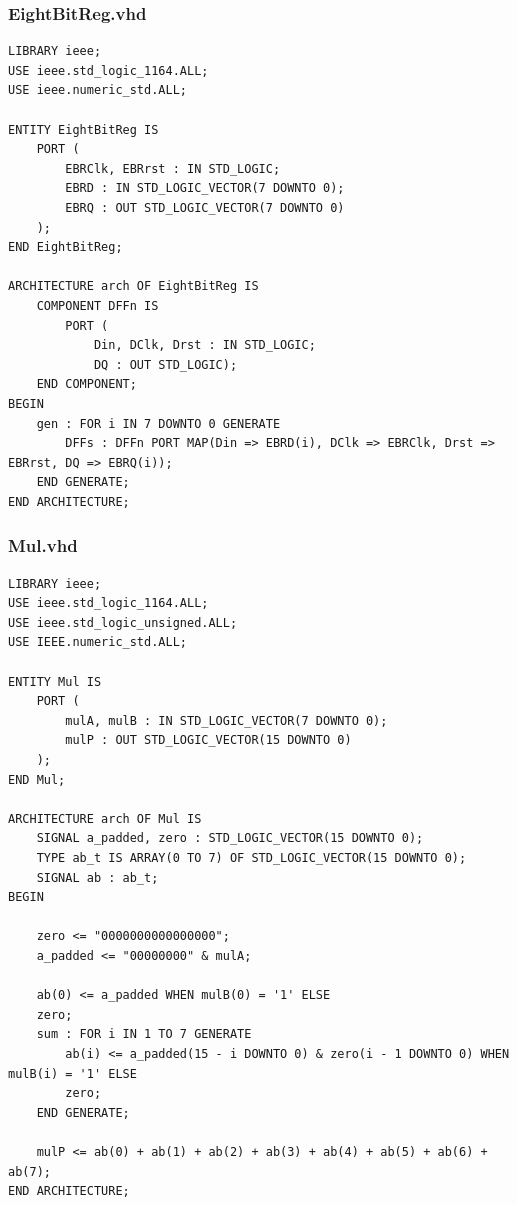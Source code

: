 \documentclass[13pt,a4paper]{report}
\begin{document}
\subsubsection{EightBitReg.vhd}
\begin{verbatim}
LIBRARY ieee;
USE ieee.std_logic_1164.ALL;
USE ieee.numeric_std.ALL;

ENTITY EightBitReg IS
	PORT (
		EBRClk, EBRrst : IN STD_LOGIC;
		EBRD : IN STD_LOGIC_VECTOR(7 DOWNTO 0);
		EBRQ : OUT STD_LOGIC_VECTOR(7 DOWNTO 0)
	);
END EightBitReg;

ARCHITECTURE arch OF EightBitReg IS
	COMPONENT DFFn IS
		PORT (
			Din, DClk, Drst : IN STD_LOGIC;
			DQ : OUT STD_LOGIC);
	END COMPONENT;
BEGIN
	gen : FOR i IN 7 DOWNTO 0 GENERATE
		DFFs : DFFn PORT MAP(Din => EBRD(i), DClk => EBRClk, Drst => EBRrst, DQ => EBRQ(i));
	END GENERATE;
END ARCHITECTURE;
\end{verbatim}

\subsubsection{Mul.vhd}
\begin{verbatim}
LIBRARY ieee;
USE ieee.std_logic_1164.ALL;
USE ieee.std_logic_unsigned.ALL;
USE IEEE.numeric_std.ALL;

ENTITY Mul IS
	PORT (
		mulA, mulB : IN STD_LOGIC_VECTOR(7 DOWNTO 0);
		mulP : OUT STD_LOGIC_VECTOR(15 DOWNTO 0)
	);
END Mul;

ARCHITECTURE arch OF Mul IS
	SIGNAL a_padded, zero : STD_LOGIC_VECTOR(15 DOWNTO 0);
	TYPE ab_t IS ARRAY(0 TO 7) OF STD_LOGIC_VECTOR(15 DOWNTO 0);
	SIGNAL ab : ab_t;
BEGIN

	zero <= "0000000000000000";
	a_padded <= "00000000" & mulA;

	ab(0) <= a_padded WHEN mulB(0) = '1' ELSE
	zero;
	sum : FOR i IN 1 TO 7 GENERATE
		ab(i) <= a_padded(15 - i DOWNTO 0) & zero(i - 1 DOWNTO 0) WHEN mulB(i) = '1' ELSE
		zero;
	END GENERATE;

	mulP <= ab(0) + ab(1) + ab(2) + ab(3) + ab(4) + ab(5) + ab(6) + ab(7);
END ARCHITECTURE;
\end{verbatim}
\end{document}
